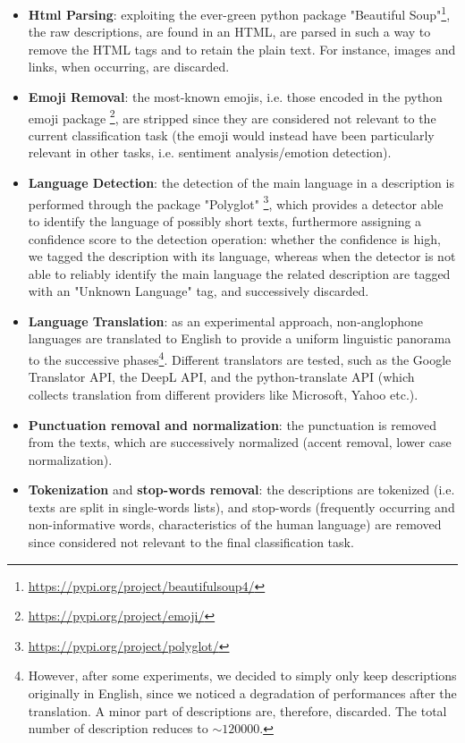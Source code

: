 \documentclass[10pt]{article}
\begin{document}
\begin{itemize}
\item \textbf{Html Parsing}: exploiting the ever-green python package "Beautiful Soup"\footnote{\url{https://pypi.org/project/beautifulsoup4/}}, the raw descriptions, are found in an HTML, are parsed in such a way to remove the HTML tags and to retain the plain text. For instance, images and links, when occurring, are discarded.
\item \textbf{Emoji Removal}: the most-known emojis, i.e. those encoded in the python emoji package \footnote{\url{https://pypi.org/project/emoji/}}, are stripped since they are considered not relevant to the current classification task (the emoji would instead have been particularly relevant in other tasks, i.e. sentiment analysis/emotion detection).
\item \textbf{Language Detection}: the detection of the main language in a description is performed through the package "Polyglot" \footnote{\url{https://pypi.org/project/polyglot/}}, which provides a detector able to identify the language of possibly short texts, furthermore assigning a confidence score to the detection operation: whether the confidence is high, we tagged the description with its language, whereas when the detector is not able to reliably identify the main language the related description are tagged with an "Unknown Language" tag, and successively discarded.

\item \textbf{Language Translation}: as an experimental approach, non-anglophone languages are translated to English to provide a uniform linguistic panorama to the successive phases\footnote{However, after some experiments, we decided to simply only keep descriptions originally in English, since we noticed a degradation of performances after the translation. A minor part of descriptions are, therefore, discarded. The total number of description reduces to $\sim 120000$.}. 
Different translators are tested, such as the Google Translator API, the DeepL API, and the python-translate API (which collects translation from different providers like Microsoft, Yahoo etc.).

\item \textbf{Punctuation removal and normalization}: the punctuation is removed from the texts, which are successively normalized (accent removal, lower case normalization).

\item \textbf{Tokenization} and \textbf{stop-words removal}: the descriptions are tokenized (i.e. texts are split in single-words lists), and stop-words (frequently occurring and non-informative words, characteristics of the human language) are removed since considered not relevant to the final classification task.


\end{itemize}
\end{document}
